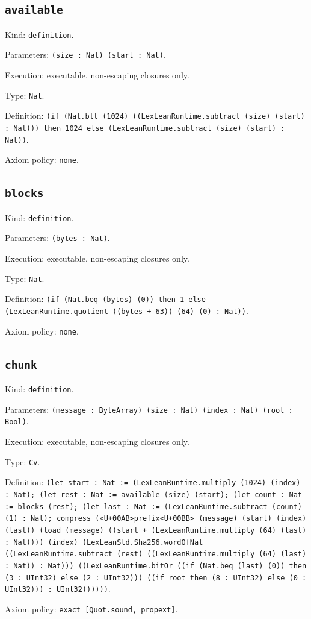 \documentclass[11pt]{article}
\begin{document}
\subsection*{\texttt{available}}
\noindent Kind: \texttt{definition}.\par
\noindent Parameters: \texttt{(size : Nat) (start : Nat)}.\par
\noindent Execution: executable, non-escaping closures only.\par
\noindent Type: \texttt{Nat}.\par
\noindent Definition: \texttt{(if (Nat.blt (1024) ((LexLeanRuntime.subtract (size) (start) : Nat))) then 1024 else (LexLeanRuntime.subtract (size) (start) : Nat))}.\par
\noindent Axiom policy: \texttt{none}.\par
\subsection*{\texttt{blocks}}
\noindent Kind: \texttt{definition}.\par
\noindent Parameters: \texttt{(bytes : Nat)}.\par
\noindent Execution: executable, non-escaping closures only.\par
\noindent Type: \texttt{Nat}.\par
\noindent Definition: \texttt{(if (Nat.beq (bytes) (0)) then 1 else (LexLeanRuntime.quotient ((bytes + 63)) (64) (0) : Nat))}.\par
\noindent Axiom policy: \texttt{none}.\par
\subsection*{\texttt{chunk}}
\noindent Kind: \texttt{definition}.\par
\noindent Parameters: \texttt{(message : ByteArray) (size : Nat) (index : Nat) (root : Bool)}.\par
\noindent Execution: executable, non-escaping closures only.\par
\noindent Type: \texttt{Cv}.\par
\noindent Definition: \texttt{(let start : Nat := (LexLeanRuntime.multiply (1024) (index) : Nat); (let rest : Nat := available (size) (start); (let count : Nat := blocks (rest); (let last : Nat := (LexLeanRuntime.subtract (count) (1) : Nat); compress (<U+00AB>prefix<U+00BB> (message) (start) (index) (last)) (load (message) ((start + (LexLeanRuntime.multiply (64) (last) : Nat)))) (index) (LexLeanStd.Sha256.wordOfNat ((LexLeanRuntime.subtract (rest) ((LexLeanRuntime.multiply (64) (last) : Nat)) : Nat))) ((LexLeanRuntime.bitOr ((if (Nat.beq (last) (0)) then (3 : UInt32) else (2 : UInt32))) ((if root then (8 : UInt32) else (0 : UInt32))) : UInt32))))))}.\par
\noindent Axiom policy: \texttt{exact [Quot.sound, propext]}.\par
\end{document}
